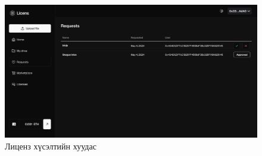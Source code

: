 \begin{figure}[h!]
	\centering
	\includegraphics[scale=0.16]{src/images/requests.png}
	\caption{Лиценз хүсэлтийн  хуудас}
\end{figure}